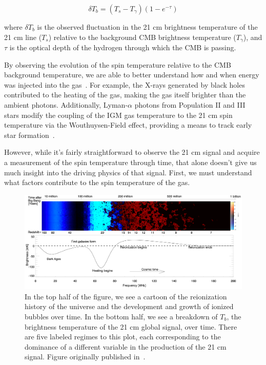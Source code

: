 \begin{equation}
    \delta T_b = (T_s - T_\gamma)(1 - e^{-\tau})
    \label{eq:21cm-brightness-temp}
\end{equation}

\noindent where $\delta T_b$ is the observed fluctuation in the 21 cm 
brightness temperature of the 21 cm line ($T_s$) relative to the background CMB 
brightness temperature ($T_\gamma$), and $\tau$ is the optical depth of the 
hydrogen through which the CMB is passing. 

By observing the evolution of the spin temperature relative to the CMB 
background temperature, we are able to better understand how and when energy 
was injected into the gas~\citep{pritchard-loeb2010}. For example, the X-rays 
generated by black holes contributed to the heating of the gas, making the gas 
itself brighter than the ambient photons. Additionally, Lyman-$\alpha$ photons 
from Population II and III stars modify the coupling of the IGM gas temperature 
to the 21 cm spin temperature via the Wouthuysen-Field effect, providing a 
means to track early star formation~\citep{furlanetto2006}.

However, while it's fairly straightforward to observe the 21 cm signal and 
acquire a measurement of the spin temperature through time, that alone doesn't 
give us much insight into the driving physics of that signal. First, we must 
understand what factors contribute to the spin temperature of the gas.

\begin{figure}
    \begin{center}
    \includegraphics[width=\linewidth]{global_signal.png}
    \end{center}
    \caption{
        In the top half of the figure, we see a cartoon of the reionization 
        history of the universe and the development and growth of ionized 
        bubbles over time. In the bottom half, we see a breakdown of $T_b$, the 
        brightness temperature of the 21 cm global signal, over time. There are 
        five labeled regimes to this plot, each corresponding to the dominance 
        of a different variable in the production of the 21 cm signal. Figure 
        originally published in~\citealp{pritchard-loeb2012}.
    }
    \label{fig:global-signal}
\end{figure}

